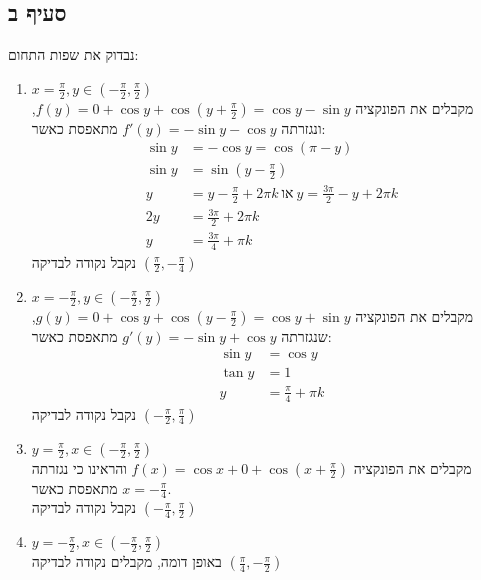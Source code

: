 \documentclass{article}
\begin{document}
\subsection*{סעיף ב}

נבדוק את שפות התחום:
\begin{enumerate}[i]
    \item $x=\frac{\pi}{2}, y\in (-\frac{\pi}{2}, \frac{\pi}{2})$ \\
          מקבלים את הפונקציה $f(y)=0+\cos y + \cos (y+\frac{\pi}{2})=\cos y - \sin y$, ונגזרתה $f'(y)=-\sin y - \cos y$ מתאפסת כאשר:
          \begin{align*}
              \sin y & = -\cos y = \cos (\pi - y)                                             \\
              \sin y & = \sin (y-\frac{\pi}{2})                                               \\
              y      & =y-\frac{\pi}{2}+2\pi k \  \text{או} \ y = \frac{3\pi}{2} - y + 2\pi k \\
              2y     & =\frac{3\pi}{2}+2\pi k                                                 \\
              y      & = \frac{3\pi}{4}+\pi k
          \end{align*}
          נקבל נקודה לבדיקה $(\frac{\pi}{2}, -\frac{\pi}{4})$
    \item $x=-\frac{\pi}{2}, y\in(-\frac{\pi}{2}, \frac{\pi}{2})$ \\
          מקבלים את הפונקציה $g(y)=0+\cos y + \cos(y-\frac{\pi}{2})=\cos y + \sin y$, שנגזרתה $g'(y)=-\sin y + \cos y$ מתאפסת כאשר:
          \begin{align*}
              \sin y & = \cos y             \\
              \tan y & = 1                  \\
              y      & =\frac{\pi}{4}+\pi k
          \end{align*}
          נקבל נקודה לבדיקה $(-\frac{\pi}{2}, \frac{\pi}{4})$
    \item $y=\frac{\pi}{2}, x\in (-\frac{\pi}{2}, \frac{\pi}{2})$ \\
          מקבלים את הפונקציה $f(x)=\cos x + 0 + \cos(x+\frac{\pi}{2})$ והראינו כי נגזרתה מתאפסת כאשר $x=-\frac{\pi}{4}$. \\
          נקבל נקודה לבדיקה $(-\frac{\pi}{4}, \frac{\pi}{2})$
    \item $y=-\frac{\pi}{2}, x\in(-\frac{\pi}{2}, \frac{\pi}{2})$ \\
          באופן דומה, מקבלים נקודה לבדיקה $(\frac{\pi}{4}, -\frac{\pi}{2})$
\end{enumerate}
\end{document}

